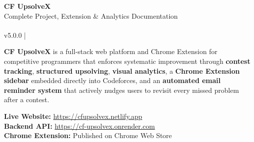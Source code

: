 \documentclass[11pt, a4paper]{article}
\begin{document}

\thispagestyle{empty}
\vspace*{0.8cm}

\begin{tcolorbox}[enhanced,colback=headerbg,colframe=headerbg,
  arc=6pt,boxrule=0pt,left=20pt,right=20pt,top=24pt,bottom=24pt,
  shadow={2pt}{-2pt}{0pt}{black!20}]
  \begin{center}
    {\fontsize{42}{50}\selectfont\bfseries\color{white} CF UpsolveX}\\[0.45em]
    {\large\ttfamily\color{white!75!headerbg}
      Complete Project, Extension \& Analytics Documentation}\\[1em]
    \\[0.65em]
    {\footnotesize\ttfamily\color{white!65!headerbg} v5.0.0 \quad|}
  \end{center}
\end{tcolorbox}

\vspace{1.2cm}

\begin{infobox}
  \textbf{CF UpsolveX} is a full-stack web platform and Chrome Extension for
  competitive programmers that enforces systematic improvement through
  \textbf{contest tracking}, \textbf{structured upsolving},
  \textbf{visual analytics}, a \textbf{Chrome Extension sidebar} embedded
  directly into Codeforces, and an \textbf{automated email reminder system}
  that actively nudges users to revisit every missed problem after a contest.

  \vspace{0.4em}
  \textbf{Live Website:} \url{https://cfupsolvex.netlify.app}\\
  \textbf{Backend API:} \url{https://cf-upsolvex.onrender.com}\\
  \textbf{Chrome Extension:} Published on Chrome Web Store
\end{infobox}

\vspace{0.7cm}
\setcounter{tocdepth}{2}
{\hypersetup{linkcolor=accent}\tableofcontents}
\newpage

\end{document}
